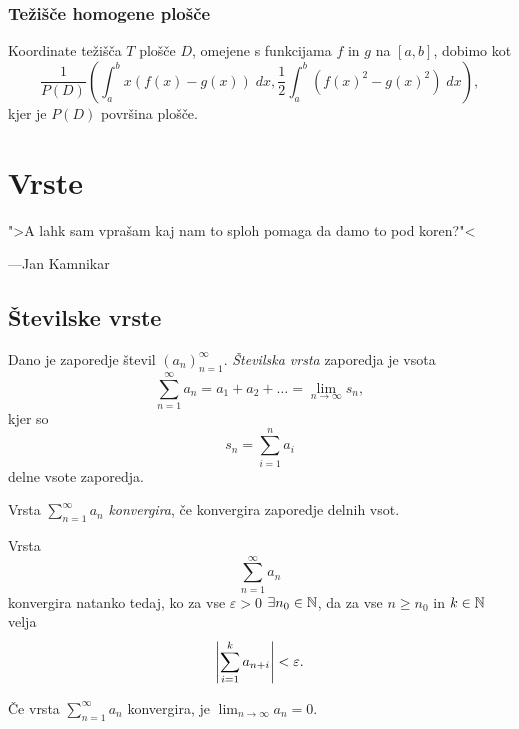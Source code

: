 \documentclass[12pt, a4paper]{article}
\begin{document}

\subsubsection{Težišče homogene plošče}

\begin{trditev}
Koordinate težišča $T$ plošče $D$, omejene s funkcijama $f$ in $g$ na $[a,b]$, dobimo kot
\[
\frac{1}{P(D)}\left(\int_a^b x\left(f(x)-g(x)\right)\;dx, \frac{1}{2}\int_a^b\left(f(x)^2-g(x)^2\right)\;dx\right),
\]
kjer je $P(D)$ površina plošče.
\end{trditev}

\newpage

\section{Vrste}

\epigraph{">A lahk sam vprašam kaj nam to sploh pomaga da damo to pod koren?"<}{---Jan Kamnikar}

\subsection{Številske vrste}

\begin{okvir}
\begin{definicija}
Dano je zaporedje števil $(a_n)_{n=1}^\infty$. \emph{Številska vrsta} zaporedja je vsota
\[
\sum_{n=1}^\infty a_n=a_1+a_2+\dots=\lim_{n\to\infty}s_n,
\]
kjer so
\[
s_n=\sum_{i=1}^n a_i
\]
delne vsote zaporedja.
\end{definicija}
\end{okvir}

\begin{definicija}
Vrsta $\displaystyle\sum_{n=1}^\infty a_n$ \emph{konvergira}, če konvergira zaporedje delnih vsot.
\end{definicija}

\begin{izrek}
Vrsta
\[
\sum_{n=1}^\infty a_n
\]
konvergira natanko tedaj, ko za vse $\varepsilon>0$ $\exists n_0\in\mathbb{N}$, da za vse $n\geq n_0$ in $k\in\mathbb{N}$ velja
\[
\left\lvert \sum_{i=1}^k a_{n+i}\right\rvert<\varepsilon.
\]
\end{izrek}

\obvs

\begin{posledica}
Če vrsta $\displaystyle\sum_{n=1}^\infty a_n$ konvergira, je $\displaystyle\lim_{n\to\infty}a_n=0$.
\end{posledica}
\end{document}
